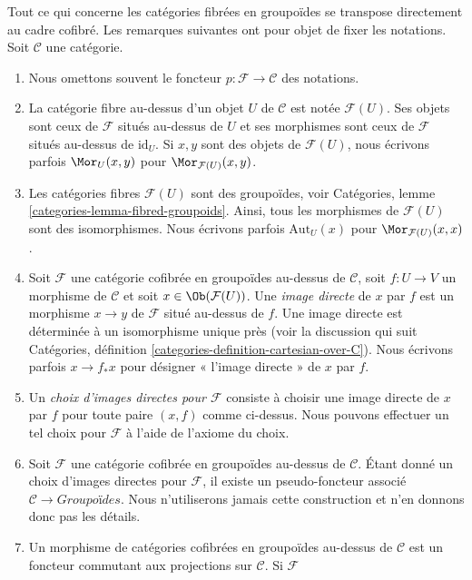 \begin{remarks}
\label{remarks-cofibered-groupoids}
Tout ce qui concerne les catégories fibrées en groupoïdes se transpose
directement au cadre cofibré. Les remarques suivantes ont pour objet de fixer
les notations. Soit $\mathcal{C}$ une catégorie.
\begin{enumerate}
\item Nous omettons souvent le foncteur $p: \mathcal{F} \to \mathcal{C}$ des
notations.
\item La catégorie fibre au-dessus d'un objet $U$ de $\mathcal{C}$ est notée
$\mathcal{F}(U)$. Ses objets sont ceux de $\mathcal{F}$ situés au-dessus de $U$
et ses morphismes sont ceux de $\mathcal{F}$ situés au-dessus de $\text{id}_U$.
Si $x, y$ sont des objets de $\mathcal{F}(U)$, nous écrivons parfois
$\Mor_U(x, y)$ pour $\Mor_{\mathcal{F}(U)}(x, y)$.
\item Les catégories fibres $\mathcal{F}(U)$ sont des groupoïdes, voir
Catégories, lemme \ref{categories-lemma-fibred-groupoids}.
Ainsi, tous les morphismes de $\mathcal{F}(U)$ sont des isomorphismes.
Nous écrivons parfois $\text{Aut}_U(x)$ pour $\Mor_{\mathcal{F}(U)}(x, x)$.
\item
\label{item-pushforward}
Soit $\mathcal{F}$ une catégorie cofibrée en groupoïdes au-dessus de
$\mathcal{C}$, soit $f: U \to V$ un morphisme de $\mathcal{C}$ et
soit $x \in \Ob(\mathcal{F}(U))$.
Une {\it image directe} de $x$ par $f$ est un morphisme
$x \to y$ de $\mathcal{F}$ situé au-dessus de $f$. Une image directe
est déterminée à un isomorphisme unique près (voir la discussion qui suit
Catégories, définition \ref{categories-definition-cartesian-over-C}).
Nous écrivons parfois $x \to f_*x$ pour désigner « l'image directe » de $x$
par $f$.
\item Un {\it choix d'images directes pour $\mathcal{F}$} consiste à choisir
une image directe de $x$ par $f$ pour toute paire $(x, f)$ comme ci-dessus. Nous
pouvons effectuer un tel choix pour $\mathcal{F}$ à l'aide de l'axiome du choix.
\item Soit $\mathcal{F}$ une catégorie cofibrée en groupoïdes au-dessus de
$\mathcal{C}$. Étant donné un choix d'images directes pour $\mathcal{F}$, il
existe un pseudo-foncteur associé $\mathcal{C} \to \textit{Groupoïdes}$.
Nous n'utiliserons jamais cette construction et n'en donnons donc pas les détails.
\item
\label{item-cofibered-morphism}
Un morphisme de catégories cofibrées en groupoïdes au-dessus de $\mathcal{C}$
est un foncteur commutant aux projections sur $\mathcal{C}$. Si $\mathcal{F}$

\end{enumerate}
\end{remarks}
